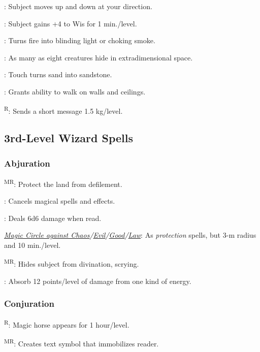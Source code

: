 	: Subject moves up and down at your direction.

	: Subject gains +4 to Wis for 1 min./level.

	: Turns fire into blinding light or choking smoke.

	: As many as eight creatures hide in extradimensional space.

	: Touch turns sand into sandstone. %

	: Grants ability to walk on walls and ceilings.

	\textsuperscript{R}: Sends a short message 1.5 kg/level.



\subsection{3rd-Level Wizard Spells}

\subsubsection{Abjuration}
	\textsuperscript{MR}: Protect the land from defilement. %

	: Cancels magical spells and effects.

	: Deals 6d6 damage when read.

	\noindent\textit{\hyperref[spell:Magic Circle against Chaos]{Magic Circle against Chaos}/\hyperref[spell:Magic Circle against Evil]{Evil}/\hyperref[spell:Magic Circle against Good]{Good}/\hyperref[spell:Magic Circle against Law]{Law}}: As \emph{protection} spells, but 3-m radius and 10 min./level.

	\textsuperscript{MR}: Hides subject from divination, scrying.

	: Absorb 12 points/level of damage from one kind of energy.

\subsubsection{Conjuration}
	\textsuperscript{R}: Magic horse appears for 1 hour/level.

	\textsuperscript{MR}: Creates text symbol that immobilizes reader.

